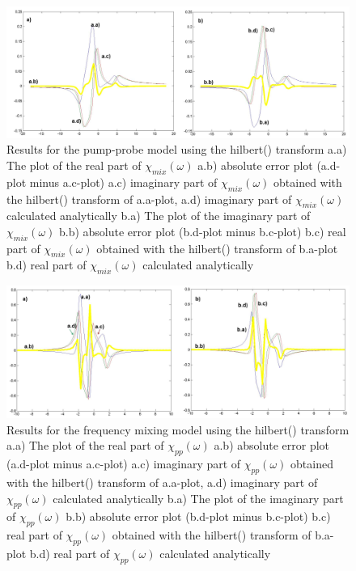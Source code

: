\documentclass[12pt,twoside,a4paper]{article}
\numberwithin{equation}{subsection}
\numberwithin{figure}{subsection}
\begin{document}
\begin{figure} 
  \includegraphics[width=150mm]{img/hilb_pnp.png}
  \caption{Results for the pump-probe model using the hilbert() transform
     a.a) The plot of the real part of ${\chi_{mix}}(\omega )$
     a.b) absolute error plot (a.d-plot minus a.c-plot)
     a.c) imaginary part of ${\chi_{mix}}(\omega )$ obtained with the hilbert() transform of a.a-plot, 
     a.d) imaginary part of ${\chi_{mix}}(\omega )$ calculated analytically 
     b.a) The plot of the imaginary part of ${\chi_{mix}}(\omega )$ 
     b.b) absolute error plot (b.d-plot minus b.c-plot)
     b.c) real part of ${\chi_{mix}}(\omega )$ obtained with the hilbert() transform of b.a-plot  
     b.d) real part of $\chi_{mix} (\omega )$ calculated analytically 
     \label{fig:hilb_pnp}
     }
\end{figure}

\begin{figure} 
  \includegraphics[width=150mm]{img/hilb_fmix.png}
  \caption{Results for the frequency mixing model using the hilbert() transform
     a.a) The plot of the real part of ${\chi_{pp}}(\omega )$
     a.b) absolute error plot (a.d-plot minus a.c-plot)
     a.c) imaginary part of ${\chi_{pp}}(\omega )$ obtained with the hilbert() transform of a.a-plot, 
     a.d) imaginary part of ${\chi_{pp}}(\omega )$ calculated analytically 
     b.a) The plot of the imaginary part of ${\chi_{pp}}(\omega )$ 
     b.b) absolute error plot (b.d-plot minus b.c-plot)
     b.c) real part of ${\chi_{pp}}(\omega )$ obtained with the hilbert() transform of b.a-plot 
     b.d) real part of $\chi_{pp} (\omega )$ calculated analytically 
     \label{fig:hilb_fmix}
     }
\end{figure} 
\end{document}

